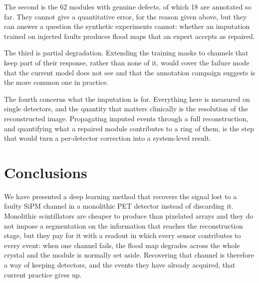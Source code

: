 \documentclass[10pt,conference]{IEEEtran}
\begin{document}
The second is the 62 modules with genuine defects, of which 18 are annotated so
far. They cannot give a quantitative error, for the reason given above, but
they can answer a question the synthetic experiments cannot: whether an
imputation trained on injected faults produces flood maps that an expert
accepts as repaired.

The third is partial degradation. Extending the training masks to channels that
keep part of their response, rather than none of it, would cover the failure
mode that the current model does not see and that the annotation campaign
suggests is the more common one in practice.

The fourth concerns what the imputation is for. Everything here is measured on
single detectors, and the quantity that matters clinically is the resolution of
the reconstructed image. Propagating imputed events through a full
reconstruction, and quantifying what a repaired module contributes to a ring of
them, is the step that would turn a per-detector correction into a
system-level result.


\section{Conclusions}
\label{sec:conclusions}

We have presented a deep learning method that recovers the signal lost to a
faulty SiPM channel in a monolithic PET detector instead of discarding it.
Monolithic scintillators are cheaper to produce than pixelated arrays and they
do not impose a segmentation on the information that reaches the reconstruction
stage, but they pay for it with a readout in which every sensor contributes to
every event: when one channel fails, the flood map degrades across the whole
crystal and the module is normally set aside. Recovering that channel is
therefore a way of keeping detectors, and the events they have already
acquired, that current practice gives up.
\end{document}
